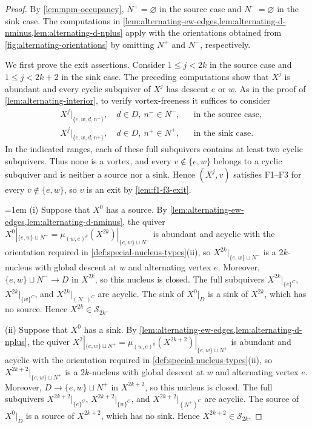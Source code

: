 \documentclass[10pt,a4paper]{amsart}
\theoremstyle{definition}
\theoremstyle{definition}
\numberwithin{equation}{section}
\numberwithin{table}{section}
\newcommand{\nminus}{N^{-}}
\newcommand{\nplus}{N^{+}}
\newcommand{\Sclass}{\mathcal{S}}
\newcommand{\Xj}[1]{X^{#1}}
\begin{document}
\begin{proof}
By \cref{lem:npm-occupancy}, $\nplus=\varnothing$ in the source case and
$\nminus=\varnothing$ in the sink case. The computations in
\cref{lem:alternating-ew-edges,lem:alternating-d-nminus,lem:alternating-d-nplus}
apply with the orientations obtained from \cref{fig:alternating-orientations}
by omitting $\nplus$ and $\nminus$, respectively.

We first prove the exit assertions. Consider $1\le j<2k$ in the source case
and $1\le j<2k+2$ in the sink case. The preceding computations show that
$\Xj{j}$ is abundant and every cyclic subquiver of $\Xj{j}$ has descent
$e$ or $w$. As in the proof of \cref{lem:alternating-interior}, to verify
vortex-freeness it suffices to consider
\[
\begin{aligned}
 &\Xj{j}|_{\{e,w,d,n^-\}},\quad d\in D,\ n^-\in\nminus,
 &&\text{in the source case},\\
 &\Xj{j}|_{\{e,w,d,n^+\}},\quad d\in D,\ n^+\in\nplus,
 &&\text{in the sink case}.
\end{aligned}
\]
In the indicated ranges, each of these full subquivers contains at least two
cyclic subquivers. Thus none is a vortex, and every $v\notin\{e,w\}$ belongs
to a cyclic subquiver and is neither a source nor a sink. Hence
$(\Xj{j},v)$ satisfies F1--F3 for every $v\notin\{e,w\}$, so $v$ is an exit
by \cref{lem:f1-f3-exit}.

\begingroup\emergencystretch=1em
\textup{(i)} Suppose that $\Xj{0}$ has a source. By
\cref{lem:alternating-ew-edges,lem:alternating-d-nminus}, the quiver
$\Xj{0}|_{\{e,w\}\sqcup\nminus}
=\mu_{(w,e)^k}(\Xj{2k})|_{\{e,w\}\sqcup\nminus}$
is abundant and acyclic with the orientation required in
\cref{def:special-nucleus-types}\textup{(ii)}, so
$\Xj{2k}|_{\{e,w\}\sqcup\nminus}$ is a $2k$-nucleus with global descent
at $w$ and alternating vertex $e$. Moreover,
$\{e,w\}\sqcup\nminus\to D$ in $\Xj{2k}$, so this nucleus is closed.
The full subquivers $\Xj{2k}|_{\{e\}^C}$, $\Xj{2k}|_{\{w\}^C}$, and
$\Xj{2k}|_{(\nminus)^C}$ are acyclic. The sink of $\Xj{0}|_D$ is a sink of $\Xj{2k}$,
which has no source. Hence $\Xj{2k}\in\Sclass_{2k}$.
\par\endgroup

\textup{(ii)} Suppose that $\Xj{0}$ has a sink. By
\cref{lem:alternating-ew-edges,lem:alternating-d-nplus}, the quiver
$\Xj{2}|_{\{e,w\}\sqcup\nplus}
=\mu_{(w,e)^k}(\Xj{2k+2})|_{\{e,w\}\sqcup\nplus}$
is abundant and acyclic with the orientation required in
\cref{def:special-nucleus-types}\textup{(ii)}, so
$\Xj{2k+2}|_{\{e,w\}\sqcup\nplus}$ is a $2k$-nucleus with global descent
at $w$ and alternating vertex $e$. Moreover,
$D\to\{e,w\}\sqcup\nplus$ in $\Xj{2k+2}$, so this nucleus is closed.
The full subquivers $\Xj{2k+2}|_{\{e\}^C}$, $\Xj{2k+2}|_{\{w\}^C}$, and
$\Xj{2k+2}|_{(\nplus)^C}$ are acyclic. The source of $\Xj{0}|_D$ is a source of
$\Xj{2k+2}$, which has no sink. Hence $\Xj{2k+2}\in\Sclass_{2k}$.
\end{proof}
\end{document}
